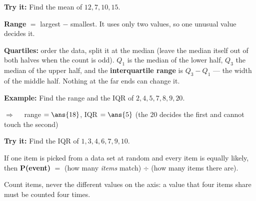 \documentclass[12pt]{article}
\begin{document}
\begin{tryitbox}
\textbf{Try it:} \quad Find the mean of $12, 7, 10, 15$.\\[2pt]
\end{tryitbox}


\begin{formulabox}
\textbf{Range} $=$ largest $-$ smallest. It uses only two values, so one unusual value decides
it.\par
\smallskip
\textbf{Quartiles:} order the data, split it at the median (leave the median itself out of both
halves when the count is odd). $Q_1$ is the median of the lower half, $Q_3$ the median of the
upper half, and the \textbf{interquartile range} is $Q_3 - Q_1$ --- the width of the middle
half. Nothing at the far ends can change it.
\end{formulabox}

\begin{examplebox}
\textbf{Example:} \quad Find the range and the IQR of $2, 4, 5, 7, 8, 9, 20$.

$\Rightarrow\quad$ range $= \ans{18}$, \quad IQR $= \ans{5}$ \quad (the $20$ decides the first
and cannot touch the second)
\end{examplebox}

\begin{tryitbox}
\textbf{Try it:} \quad Find the IQR of $1, 3, 4, 6, 7, 9, 10$.\\[2pt]
\end{tryitbox}


\begin{formulabox}
If one item is picked from a data set at random and every item is equally likely, then
\textbf{P(event)} $=$ (how many \emph{items} match) $\div$ (how many items there are).\par
\smallskip
Count items, never the different values on the axis: a value that four items share must be
counted four times.
\end{formulabox}
\end{document}
